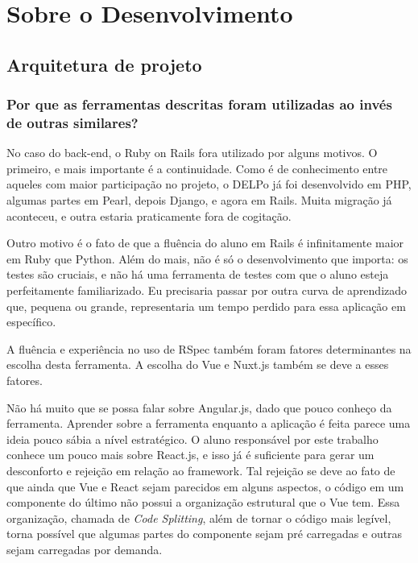 
\chapter{Sobre o Desenvolvimento}
\label{cap:development}
\minitoc


\section{Arquitetura de projeto}\label{sec:arquitetura}

\subsection{Por que as ferramentas descritas foram utilizadas ao invés de outras similares?}
\label{subsec:ferramentas}

No caso do back-end, o Ruby on Rails fora utilizado por alguns motivos. O primeiro, e mais importante é a
continuidade. Como é de conhecimento entre aqueles com maior participação no projeto, o DELPo já foi
desenvolvido em PHP, algumas partes em Pearl, depois Django, e agora em Rails. Muita migração já aconteceu,
e outra estaria praticamente fora de cogitação.

Outro motivo é o fato de que a fluência do aluno em Rails é infinitamente maior em Ruby que Python. Além do
mais, não é só o desenvolvimento que importa: os testes são cruciais, e não há uma ferramenta de testes com
que o aluno esteja perfeitamente familiarizado. Eu precisaria passar por outra curva de aprendizado que, pequena
ou grande, representaria um tempo perdido para essa aplicação em específico.

A fluência e experiência no uso de RSpec também foram fatores determinantes na escolha desta ferramenta. A
escolha do Vue e Nuxt.js também se deve a esses fatores.

Não há muito que se possa falar sobre Angular.js, dado que pouco conheço da ferramenta. Aprender sobre a
ferramenta enquanto a aplicação é feita parece uma ideia pouco sábia a nível estratégico. O aluno responsável
por este trabalho conhece um pouco mais sobre React.js, e isso já é suficiente para gerar um desconforto e
rejeição em relação ao framework. Tal rejeição se deve ao fato de que ainda que Vue e React sejam parecidos
em alguns aspectos, o código em um componente do último não possui a organização estrutural que o Vue tem.
Essa organização, chamada de \emph{Code Splitting}, além de tornar o código mais legível, torna possível que
algumas partes do componente sejam pré carregadas e outras sejam carregadas por demanda.

